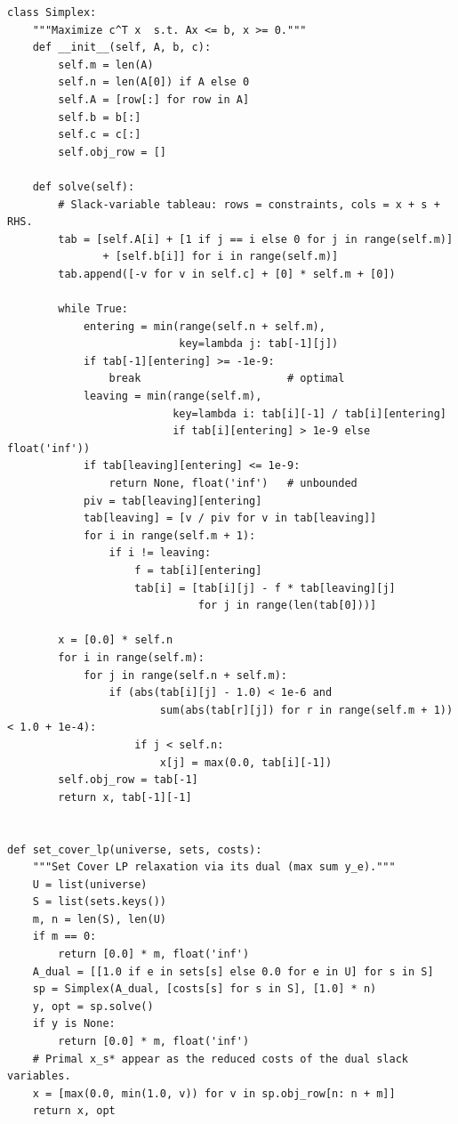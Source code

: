 \begin{lstlisting}[style=python, caption=LP Rounding for Set Cover]
class Simplex:
    """Maximize c^T x  s.t. Ax <= b, x >= 0."""
    def __init__(self, A, b, c):
        self.m = len(A)
        self.n = len(A[0]) if A else 0
        self.A = [row[:] for row in A]
        self.b = b[:]
        self.c = c[:]
        self.obj_row = []

    def solve(self):
        # Slack-variable tableau: rows = constraints, cols = x + s + RHS.
        tab = [self.A[i] + [1 if j == i else 0 for j in range(self.m)]
               + [self.b[i]] for i in range(self.m)]
        tab.append([-v for v in self.c] + [0] * self.m + [0])

        while True:
            entering = min(range(self.n + self.m),
                           key=lambda j: tab[-1][j])
            if tab[-1][entering] >= -1e-9:
                break                       # optimal
            leaving = min(range(self.m),
                          key=lambda i: tab[i][-1] / tab[i][entering]
                          if tab[i][entering] > 1e-9 else float('inf'))
            if tab[leaving][entering] <= 1e-9:
                return None, float('inf')   # unbounded
            piv = tab[leaving][entering]
            tab[leaving] = [v / piv for v in tab[leaving]]
            for i in range(self.m + 1):
                if i != leaving:
                    f = tab[i][entering]
                    tab[i] = [tab[i][j] - f * tab[leaving][j]
                              for j in range(len(tab[0]))]

        x = [0.0] * self.n
        for i in range(self.m):
            for j in range(self.n + self.m):
                if (abs(tab[i][j] - 1.0) < 1e-6 and
                        sum(abs(tab[r][j]) for r in range(self.m + 1)) < 1.0 + 1e-4):
                    if j < self.n:
                        x[j] = max(0.0, tab[i][-1])
        self.obj_row = tab[-1]
        return x, tab[-1][-1]


def set_cover_lp(universe, sets, costs):
    """Set Cover LP relaxation via its dual (max sum y_e)."""
    U = list(universe)
    S = list(sets.keys())
    m, n = len(S), len(U)
    if m == 0:
        return [0.0] * m, float('inf')
    A_dual = [[1.0 if e in sets[s] else 0.0 for e in U] for s in S]
    sp = Simplex(A_dual, [costs[s] for s in S], [1.0] * n)
    y, opt = sp.solve()
    if y is None:
        return [0.0] * m, float('inf')
    # Primal x_s* appear as the reduced costs of the dual slack variables.
    x = [max(0.0, min(1.0, v)) for v in sp.obj_row[n: n + m]]
    return x, opt



\end{lstlisting}
